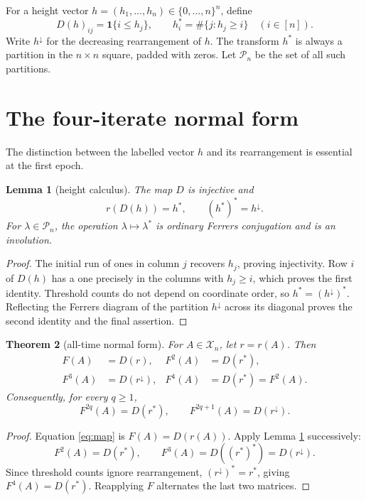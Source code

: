 \documentclass[a4paper,10pt]{amsart}
\newtheorem{theorem}{Theorem}
\newtheorem{lemma}[theorem]{Lemma}
\theoremstyle{remark}
\newcommand{\X}{\mathcal X}
\newcommand{\Pbox}{\mathcal P}
\begin{document}
For a height vector $h=(h_1,\ldots,h_n)\in\{0,\ldots,n\}^n$, define
\begin{equation}\label{eq:diagram-star}
 D(h)_{ij}=\mathbf1\{i\leq h_j\},\qquad
 h_i^*=\#\{j:h_j\geq i\}\quad(i\in[n]).
\end{equation}
Write $h^\downarrow$ for the decreasing rearrangement of $h$.  The transform
$h^*$ is always a partition in the $n\times n$ square, padded with zeros.
Let $\Pbox_n$ be the set of all such partitions.

\section{The four-iterate normal form}

The distinction between the labelled vector $h$ and its rearrangement is
essential at the first epoch.

\begin{lemma}[height calculus]\label{lem:height}
The map $D$ is injective and
\begin{equation}\label{eq:height-calculus}
 r(D(h))=h^*,\qquad (h^*)^*=h^\downarrow.
\end{equation}
For $\lambda\in\Pbox_n$, the operation $\lambda\mapsto\lambda^*$ is ordinary
Ferrers conjugation and is an involution.
\end{lemma}

\begin{proof}
The initial run of ones in column $j$ recovers $h_j$, proving injectivity.
Row $i$ of $D(h)$ has a one precisely in the columns with $h_j\geq i$, which
proves the first identity.  Threshold counts do not depend on coordinate
order, so $h^*=(h^\downarrow)^*$.  Reflecting the Ferrers diagram of the
partition $h^\downarrow$ across its diagonal proves the second identity and
the final assertion.
\end{proof}

\begin{theorem}[all-time normal form]\label{thm:normal}
For $A\in\X_n$, let $r=r(A)$.  Then
\begin{align}
 F(A)&=D(r),& F^2(A)&=D(r^*),\label{eq:first-second}\\
 F^3(A)&=D(r^\downarrow),& F^4(A)&=D(r^*)=F^2(A).\label{eq:third-fourth}
\end{align}
Consequently, for every $q\geq1$,
\[
 F^{2q}(A)=D(r^*),\qquad F^{2q+1}(A)=D(r^\downarrow).
\]
\end{theorem}

\begin{proof}
Equation \eqref{eq:map} is $F(A)=D(r(A))$.  Apply Lemma
\ref{lem:height} successively:
\[
 F^2(A)=D(r^*),\qquad
 F^3(A)=D((r^*)^*)=D(r^\downarrow).
\]
Since threshold counts ignore rearrangement,
$(r^\downarrow)^*=r^*$, giving $F^4(A)=D(r^*)$.  Reapplying $F$ alternates
the last two matrices.
\end{proof}
\end{document}
